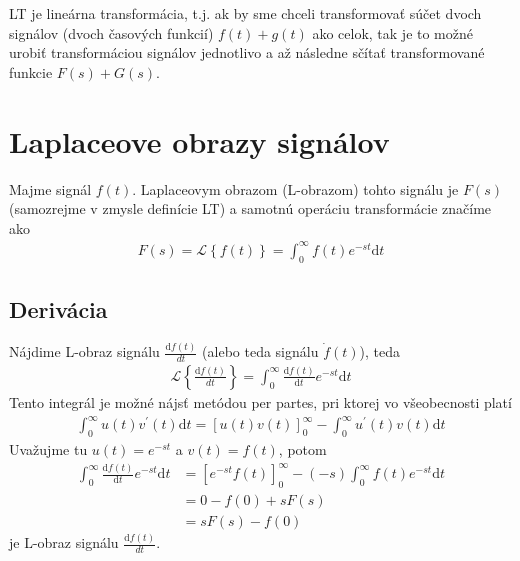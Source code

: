 \documentclass[a4paper, 10pt, ]{article}
\begin{document}
LT je lineárna transformácia, t.j. ak by sme chceli transformovať súčet dvoch signálov (dvoch časových funkcií) $f(t) + g(t)$ ako celok, tak je to možné urobiť transformáciou signálov jednotlivo a až následne sčítať transformované funkcie $F(s) + G(s)$.





\section{Laplaceove obrazy signálov}

Majme signál $f(t)$. Laplaceovym obrazom (L-obrazom) tohto signálu je $F(s)$ (samozrejme v zmysle definície LT) a samotnú operáciu transformácie značíme ako
\begin{align}
    F(s)  =  \mathcal L \left\{ f(t) \right\} = \int_0^\infty f(t) e^{-st}\text{d}t
\end{align}


\subsection{Derivácia}


Nájdime L-obraz signálu $\frac{\text{d}f(t)}{dt}$ (alebo teda signálu $\dot f(t)$), teda
\begin{align}
    \mathcal L \left\{ \frac{\text{d}f(t)}{dt} \right\} = \int_0^\infty \frac{\text{d}f(t)}{\text{d}t} e^{-st}\text{d}t
\end{align}
Tento integrál je možné nájsť metódou per partes, pri ktorej vo všeobecnosti platí
\begin{align}
    \int_0^\infty u(t)v^\prime(t)\text{d}t = \left[ u(t)v(t) \right]_0^\infty - \int_0^\infty u^\prime(t) v(t) \text{d}t
\end{align}
Uvažujme tu $u(t) = e^{-st}$ a $v(t) = f(t)$, potom
\begin{equation}
    \begin{aligned}
        \int_0^\infty \frac{\text{d}f(t)}{\text{d}t} e^{-st}\text{d}t
            &=  \left[ e^{-st} f(t) \right]_0^\infty - (-s)  \int_0^\infty f(t) e^{-st}\text{d}t \\
            &= 0 - f(0) + s F(s) \\
            &= s F(s) - f(0)
    \end{aligned}
\end{equation}
je L-obraz signálu $\frac{\text{d}f(t)}{dt}$.
\end{document}
